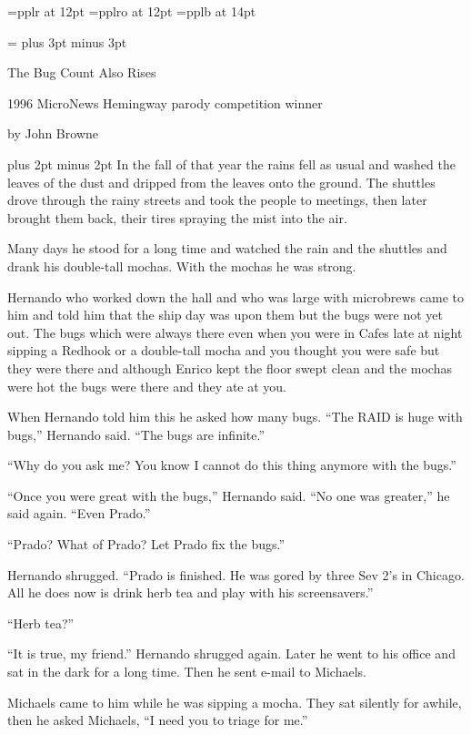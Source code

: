 \font\twelverm=pplr at 12pt
\font\twelvesl=pplro at 12pt
\font\biggerbold=pplb at 14pt
\def\rm{\twelverm}

\footline={\hss\rm\folio\hss} %
\parskip=3pt\baselineskip=14pt %
\rm
\vglue 0.5in plus 3pt minus 3pt
\centerline{\biggerbold The Bug Count Also Rises}
\smallskip
\centerline{1996 {\twelvesl MicroNews} Hemingway parody competition winner}
\centerline{by John Browne}
\vglue 0.5in plus 2pt minus 2pt
\noindent In the fall of that year the rains fell as usual and washed
the leaves of the dust and dripped from the leaves onto the
ground. The shuttles drove through the rainy streets and took the
people to meetings, then later brought them back, their tires spraying
the mist into the air.

Many days he stood for a long time and watched
the rain and the shuttles and drank his double-tall mochas. With the
mochas he was strong.

Hernando who worked down the hall and who was large with microbrews
came to him and told him that the ship day was upon them but the bugs
were not yet out. The bugs which were always there even when you were
in Cafes late at night sipping a Redhook or a double-tall mocha and
you thought you were safe but they were there and although Enrico kept
the floor swept clean and the mochas were hot the bugs were there and
they ate at you.

When Hernando told him this he asked how many bugs.
``The RAID is huge with bugs,'' Hernando said. ``The bugs are infinite.''

``Why do you ask me? You know I cannot do this thing anymore with the
bugs.''

``Once you were great with the bugs,'' Hernando said. ``No one was
greater,'' he said again. ``Even Prado.''

``Prado? What of Prado? Let Prado fix the bugs.''

Hernando shrugged. ``Prado is finished. He was gored by three Sev 2's
in Chicago. All he does now is drink herb tea and play with his
screensavers.''

``Herb tea?''

``It is true, my friend.'' Hernando shrugged again.
Later he went to his office and sat in the dark for a long time. Then
he sent e-mail to Michaels.

Michaels came to him while he was sipping a mocha. They sat silently
for awhile, then he asked Michaels, ``I need you to triage for me.''

